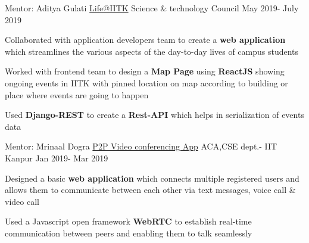 \begin{cventries}
  \cventry
    {Mentor: Aditya Gulati}
    {\href{https://github.com/life-iitk}{Life@IITK}}
    {Science \& technology Council}
    {May 2019- July 2019}
    {
      \begin{cvitems}
        \item {Collaborated with application developers team to create a \textbf{web application} which streamlines the various aspects of the day-to-day lives of campus students}
        \item {Worked with frontend team to design a \textbf{Map Page} using \textbf{ReactJS} showing ongoing events in IITK with pinned location on map according to building or place where events are going to happen}
        \item {Used \textbf{Django-REST} to create a \textbf{Rest-API} which helps in serialization of events data}
      \end{cvitems}
    }

    \cventry
    {Mentor: Mrinaal Dogra}
    {\href{https://github.com/RohitRanjangit/P2P-video-conferencing-app}{P2P Video conferencing App}}
    {ACA,CSE dept.- IIT Kanpur}
    {Jan 2019- Mar 2019}
    {
      \begin{cvitems}
        \item Designed a basic \textbf{web application} which connects multiple registered users and allows them to communicate between each other via text messages, voice call \& video call
        \item Used a Javascript open framework \textbf{WebRTC} to establish real-time communication between peers and enabling them to talk seamlessly
      \end{cvitems}
    } 




\end{cventries}
\vspace{-2mm}

